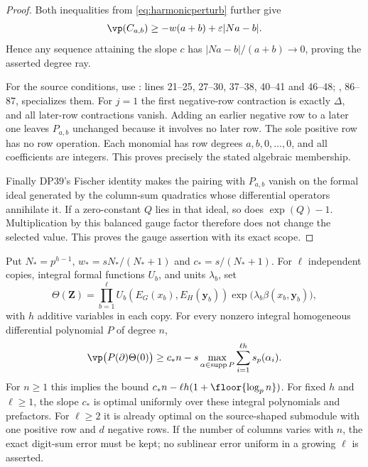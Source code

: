 \begin{proof}
Both inequalities from \eqref{eq:harmonicperturb} further give
\[
 \vp(C_{a,b})\ge-w(a+b)+\varepsilon|Na-b|.
\]
Hence any sequence attaining the slope $c$ has
$|Na-b|/(a+b)\to0$, proving the asserted degree ray.

For the source conditions, use :  lines 21--25,
 27--30,  37--38,  40--41 and
 46--48; ,  86--87, specializes them.
For $j=1$ the first negative-row contraction is exactly $\Delta$, and all later-row contractions vanish.
Adding an earlier negative row to a later one leaves $P_{a,b}$ unchanged because it involves no later row.
The sole positive row has no row operation.
Each monomial has row degrees $a,b,0,\ldots,0$, and all coefficients are integers.
This proves precisely the stated algebraic  membership.

Finally DP39's Fischer identity makes the pairing with $P_{a,b}$ vanish on the formal ideal generated by the column-sum quadratics whose differential operators annihilate it.
If a zero-constant $Q$ lies in that ideal, so does $\exp(Q)-1$.
Multiplication by this balanced gauge factor therefore does not change the selected value.
This proves the gauge assertion with its exact scope.
\end{proof}

\begin{corollary}
Put $N_*=p^{h-1}$, $w_*=sN_* /(N_*+1)$ and $c_*=s/(N_*+1)$.
For $\ell$ independent copies, integral formal functions $U_b$, and units $\lambda_b$, set
\[
 \Theta(\mathbf Z)=\prod_{b=1}^{\ell}
 U_b(E_G(x_b),E_H(\mathbf y_b))
 \exp\bigl(\lambda_b\beta(x_b,\mathbf y_b)\bigr),
\]
with $h$ additive variables in each copy.
For every nonzero integral homogeneous differential polynomial $P$ of degree $n$,
\begin{equation}\label{eq:harmonicuniversal}
 \vp\bigl(P(\partial)\Theta(0)\bigr)
 \ge c_*n-s\max_{\alpha\in\operatorname{supp}P}
                  \sum_{i=1}^{\ell h}s_p(\alpha_i).
\end{equation}
For $n\ge1$ this implies the bound
$c_*n-\ell h(1+\floor{\log_p n})$.
For fixed $h$ and $\ell\ge1$, the slope $c_*$ is optimal uniformly over these integral polynomials and prefactors.
For $\ell\ge2$ it is already optimal on the source-shaped  submodule with one positive row and $d$ negative rows.
If the number of columns varies with $n$, the exact digit-sum error must be kept; no sublinear error uniform in a growing $\ell$ is asserted.
\end{corollary}

